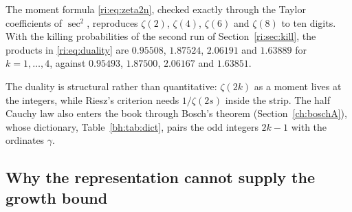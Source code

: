 The moment formula \eqref{ri:eq:zeta2n}, checked exactly through the Taylor coefficients of $\sec^2$, reproduces $\zeta(2)$, $\zeta(4)$, $\zeta(6)$ and $\zeta(8)$ to ten digits. With the killing probabilities of the second run of Section~\ref{ri:sec:kill}, the products in \eqref{ri:eq:duality} are $0.95508$, $1.87524$, $2.06191$ and $1.63889$ for $k=1,\dots,4$, against $0.95493$, $1.87500$, $2.06167$ and $1.63851$.

The duality is structural rather than quantitative: $\zeta(2k)$ as a moment lives at the integers, while Riesz's criterion needs $1/\zeta(2s)$ inside the strip. The half Cauchy law also enters the book through Bosch's theorem \cite{boBosch} (Section~\ref{ch:boschA}), whose dictionary, Table~\ref{bh:tab:dict}, pairs the odd integers $2k-1$ with the ordinates $\gamma$.

\subsection{Why the representation cannot supply the growth bound}\label{ri:sec:help}

